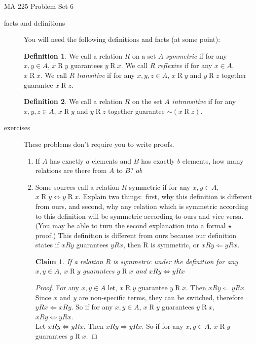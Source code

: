 \documentclass[11pt]{letter}
\newtheorem{claim}{Claim}
\theoremstyle{definition}
\newtheorem{definition}{Definition}
\begin{document}
\pagestyle{empty}

{\Large MA 225 Problem Set 6}\\

\begin{description}
	\item[facts and definitions] You will need the following definitions and facts (at some point):

\begin{definition}
	We call a relation $R$ on a set $A$ {\em symmetric} if for any $x,y\in A$, $x\operatorname{R} y$ guarantees $y\operatorname{R} x$. We call $R$ {\em reflexive} if for any $x\in A$, $x\operatorname{R} x$. We call $R$ {\em transitive} if for any $x,y,z\in A$, $x\operatorname{R} y$ and $y\operatorname{R} z$ together guarantee $x\operatorname{R} z$.
\end{definition}

\begin{definition}
	We call a relation $R$ on the set $A$ {\em intransitive} if for any $x,y,z\in A$, $x\operatorname{R} y$ and $y\operatorname{R} z$ together guarantee $\sim(x\operatorname{R} z)$.
\end{definition}

\item[exercises]  These problems don't require you to write proofs.
		\begin{enumerate}
			\item If $A$ has exactly $a$ elements and $B$ has exactly $b$ elements, how many relations are there from $A$ to $B$? $ab$
			\item Some sources call a relation $R$ symmetric if for any $x,y\in A$, $x\operatorname{R}y \Leftrightarrow y\operatorname{R}x$. Explain two things:~first, why this definition is different from ours, and second, why any relation which is symmetric according to this definition will be symmetric according to ours and vice versa. (You may be able to turn the second explanation into a formal $\star$ proof.) This definition is different from ours because our definition states if $xRy$ guarantees $yRx$, then R is symmetric, or $xRy\Leftarrow yRx$.
                          \begin{claim}
                            If a relation R is symmetric under the definition for any $x,y\in A$, $x\operatorname{R} y$ guarantees $y\operatorname{R} x$ and $xRy\Leftrightarrow yRx$
                          \end{claim}
                          \begin{proof}
                            For any $x,y\in A$ let, $x\operatorname{R} y$ guarantee $y\operatorname{R} x$. Then $xRy\Leftarrow yRx$  Since $x$ and $y$ are non-specific terms, they can be switched, therefore $yRx\Leftarrow xRy$. So if for any $x,y\in A$, $x\operatorname{R} y$ guarantees $y\operatorname{R} x$, $xRy\Leftrightarrow yRx$.\\
                            Let $xRy\Leftrightarrow yRx$. Then $xRy\Rightarrow yRx$. So if for any $x,y\in A$, $x\operatorname{R} y$ guarantees $y\operatorname{R} x$.
                          \end{proof}
                          

\end{enumerate}
\end{description}
\end{document}
